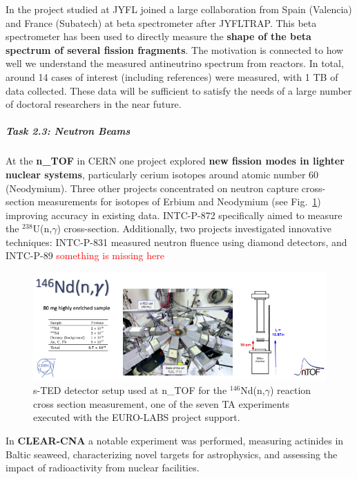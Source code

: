 In the project studied at JYFL joined a large collaboration from Spain (Valencia) and France (Subatech) at beta spectrometer after JYFLTRAP. This beta spectrometer has been used to directly measure the \textbf{shape of the beta spectrum of several fission fragments}. The motivation is connected to how well we understand the measured antineutrino spectrum from reactors.
In total, around 14 cases of interest (including references) were measured, with 1 TB of data collected. These data will be sufficient to satisfy the needs of a large number of doctoral researchers in the near future.


\subparagraph{Task 2.3: Neutron Beams} \mbox{}

At the \textbf{n\_TOF} in CERN one project explored \textbf{new fission modes in lighter nuclear systems}, particularly cerium isotopes around atomic number 60 (Neodymium). Three other projects concentrated on neutron capture cross-section measurements for isotopes of Erbium and Neodymium (see Fig.~\ref{fig:n_TOF-146Nd})  improving accuracy in existing data. INTC-P-872 specifically aimed to measure the $^{238}$U(n,$\gamma$) cross-section. Additionally, two projects investigated innovative techniques: INTC-P-831 measured neutron fluence using diamond detectors, and INTC-P-89
\textcolor{red}{something is missing here}

\begin{figure}[!h]
    \centering
    \includegraphics[width=1.0\linewidth]{graphics/n_TOF-146Nd.png}
    \caption{s-TED detector setup used at n\_TOF for the $^{146}$Nd(n,$\gamma$) reaction cross section measurement, one of the seven TA experiments executed with the EURO-LABS project support.}
    \label{fig:n_TOF-146Nd}
\end{figure}

In \textbf{CLEAR-CNA} a notable experiment was performed, measuring actinides in Baltic seaweed, characterizing novel targets for astrophysics, and assessing the impact of radioactivity from nuclear facilities. 


